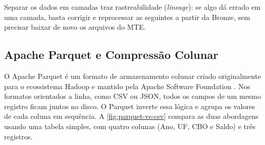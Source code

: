 Separar os dados em camadas traz rastreabilidade (\textit{lineage}): se algo dá errado em uma camada, basta corrigir e reprocessar as seguintes a partir da Bronze, sem precisar baixar de novo os arquivos do MTE.

\subsection{Apache Parquet e Compressão Colunar}

O Apache Parquet é um formato de armazenamento colunar criado originalmente para o ecossistema Hadoop e mantido pela Apache Software Foundation \cite{ApacheParquet2024}. Nos formatos orientados a linha, como CSV ou JSON, todos os campos de um mesmo registro ficam juntos no disco. O Parquet inverte essa lógica e agrupa os valores de cada coluna em sequência. A \autoref{fig:parquet-vs-csv} compara as duas abordagens usando uma tabela simples, com quatro colunas (Ano, UF, CBO e Saldo) e três registros.

